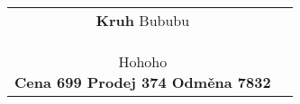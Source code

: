 \documentclass[a4paper,12pt]{article}
\begin{document}
\begin{center}
\renewcommand{\arraystretch}{2.5} %

\begin{longtable}{|c|c|}
\hline
  \parbox[t]{0.49\textwidth}{\sf\large\textbf{ Kruh } \hfill\small Bububu \\ \\
\normalsize { Hohoho } \\
  \vfill \center\textbf{Cena 699 \hfill Prodej 374 \hfill Odměna 7832 } \\ \vspace{6pt} }
\\ \hline
&
\\
\hline
\end{longtable}
\end{center}
\end{document}
